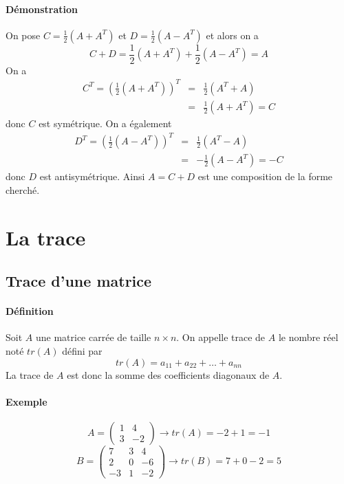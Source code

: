 \paragraph{Démonstration}  On pose $C = \frac{1}{2} ( A + A^{T})$ et $D = \frac{1}{2} ( A - A^{T})$ et alors on a
$$ C + D = \frac{1}{2} ( A + A^{T}) + \frac{1}{2} ( A - A^{T}) = A$$
On a 
\begin{eqnarray*} 
  C^{T} = (\frac{1}{2} ( A + A^{T}))^{T} &=& \frac{1}{2} ( A^{T} + A) \\
    &=& \frac{1}{2} ( A + A^{T}) = C
\end{eqnarray*}
donc $C$ est symétrique. On a également
\begin{eqnarray*}
  D^{T} = (\frac{1}{2} ( A - A^{T}))^{T} &=& \frac{1}{2} ( A^{T} - A) \\
    &=& -\frac{1}{2} ( A - A^{T}) = -C
\end{eqnarray*}
donc $D$ est antisymétrique. Ainsi $A = C + D$ est une composition de la forme cherché.

%
%
\section{La trace}
%
%
%
\subsection{Trace d'une matrice}
%
\paragraph{Définition} Soit $A$ une matrice carrée de taille $n\times n$. On appelle trace de $A$ le nombre réel noté $tr(A)$ défini par
$$tr(A) = a_{11} + a_{22} + \ldots + a_{nn}$$
La trace de $A$ est donc la somme des coefficients diagonaux de $A$.

\paragraph{Exemple} 
$$A = \begin{pmatrix} 1 & 4 \\ 3 & -2 \end{pmatrix} \rightarrow tr(A) = -2 + 1 = -1$$
$$B = \begin{pmatrix} 7 & 3 & 4 \\ 2 & 0 & -6 \\ -3 & 1 & -2 \end{pmatrix} \rightarrow tr(B) = 7 + 0 - 2 = 5$$

